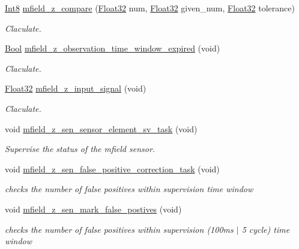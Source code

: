 \begin{DoxyCompactItemize}
\hyperlink{a00072_a7e31ca7716b8d85dd473450a5c5e5a97}{Int8} \hyperlink{a00053_a1dac7e7549c1a5b33e90e7a53f63bf5b}{mfield\+\_\+z\+\_\+compare} (\hyperlink{a00072_a87d38f886e617ced2698fc55afa07637}{Float32} num, \hyperlink{a00072_a87d38f886e617ced2698fc55afa07637}{Float32} given\+\_\+num, \hyperlink{a00072_a87d38f886e617ced2698fc55afa07637}{Float32} tolerance)
\begin{DoxyCompactList}\small\item\em Claculate. \end{DoxyCompactList}\item 
\hyperlink{a00072_a253b248072cfc8bd812c69acd0046eed}{Bool} \hyperlink{a00053_a8d1f1b622ef0081218e8f64cd9a44e59}{mfield\+\_\+z\+\_\+observation\+\_\+time\+\_\+window\+\_\+expired} (void)
\begin{DoxyCompactList}\small\item\em Claculate. \end{DoxyCompactList}\item 
\hyperlink{a00072_a87d38f886e617ced2698fc55afa07637}{Float32} \hyperlink{a00053_a30e963041fabe45400803a40cc920b85}{mfield\+\_\+z\+\_\+input\+\_\+signal} (void)
\begin{DoxyCompactList}\small\item\em Claculate. \end{DoxyCompactList}\item 
void \hyperlink{a00053_ab3b441646e86a6cf6ddfe83c1af4e075}{mfield\+\_\+z\+\_\+sen\+\_\+sensor\+\_\+element\+\_\+sv\+\_\+task} (void)
\begin{DoxyCompactList}\small\item\em Supervise the status of the mfield sensor. \end{DoxyCompactList}\item 
void \hyperlink{a00053_a36a65e3e838c4f7be43267a10532d318}{mfield\+\_\+z\+\_\+sen\+\_\+false\+\_\+positive\+\_\+correction\+\_\+task} (void)
\begin{DoxyCompactList}\small\item\em checks the number of false positives within supervision time window \end{DoxyCompactList}\item 
void \hyperlink{a00053_acd2adf617d062b1d3dfc9df79aa2ad32}{mfield\+\_\+z\+\_\+sen\+\_\+mark\+\_\+false\+\_\+postives} (void)
\begin{DoxyCompactList}\small\item\em checks the number of false positives within supervision (100ms $\vert$ 5 cycle) time window \end{DoxyCompactList}\end{DoxyCompactItemize}
